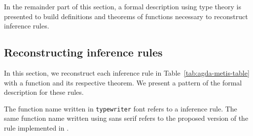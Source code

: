 \documentclass[../main.tex]{subfiles}
\begin{document}
In the remainder part of this section, a formal description using
type theory is presented to build definitions and theorems of
functions necessary to reconstruct \Metis inference rules.


\subsection{Reconstructing \Metis inference rules}
\label{ssec:emulating-inferences}

In this section, we reconstruct each \Metis inference rule
in Table~\ref{tab:agda-metis-table} with a
function and its respective theorem. We present a pattern of the
formal description for these rules.

\begin{notation}
The function name written in \texttt{typewriter} font refers to
a \Metis inference rule.
The same function name written using \textsf{sans serif} refers to the proposed
version of the rule implemented in \cite{AgdaProp,AgdaMetis}.
\end{notation}
\end{document}
